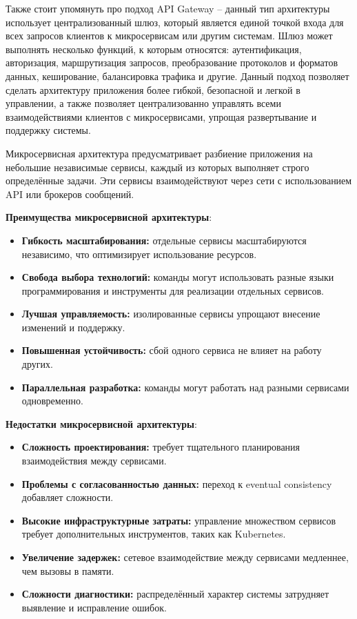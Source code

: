 Также стоит упомянуть про подход API Gateway – данный тип архитектуры использует централизованный шлюз, который является единой точкой входа для всех запросов клиентов к микросервисам или другим системам. Шлюз может выполнять несколько функций, к которым относятся: аутентификация, авторизация, маршрутизация запросов, преобразование протоколов и форматов данных, кеширование, балансировка трафика и другие. Данный подход позволяет сделать архитектуру приложения более гибкой, безопасной и легкой в управлении, а также позволяет централизованно управлять всеми взаимодействиями клиентов с микросервисами, упрощая развертывание и поддержку системы.

Микросервисная архитектура предусматривает разбиение приложения на небольшие независимые сервисы, каждый из которых выполняет строго определённые задачи. Эти сервисы взаимодействуют через сети с использованием API или брокеров сообщений.

\textbf{Преимущества микросервисной архитектуры}:
\begin{itemize}
    \item \textbf{Гибкость масштабирования:} отдельные сервисы масштабируются независимо, что оптимизирует использование ресурсов.
    \item \textbf{Свобода выбора технологий:} команды могут использовать разные языки программирования и инструменты для реализации отдельных сервисов.
    \item \textbf{Лучшая управляемость:} изолированные сервисы упрощают внесение изменений и поддержку.
    \item \textbf{Повышенная устойчивость:} сбой одного сервиса не влияет на работу других.
    \item \textbf{Параллельная разработка:} команды могут работать над разными сервисами одновременно.
\end{itemize}

\textbf{Недостатки микросервисной архитектуры}:
\begin{itemize}
    \item \textbf{Сложность проектирования:} требует тщательного планирования взаимодействия между сервисами.
    \item \textbf{Проблемы с согласованностью данных:} переход к eventual consistency добавляет сложности.
    \item \textbf{Высокие инфраструктурные затраты:} управление множеством сервисов требует дополнительных инструментов, таких как Kubernetes.
    \item \textbf{Увеличение задержек:} сетевое взаимодействие между сервисами медленнее, чем вызовы в памяти.
    \item \textbf{Сложности диагностики:} распределённый характер системы затрудняет выявление и исправление ошибок.
\end{itemize}

